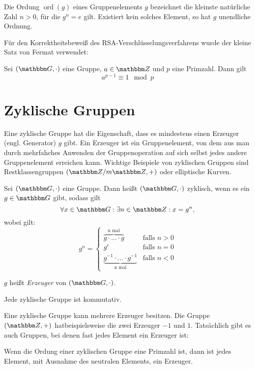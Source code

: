 \begin{definition}
  Die Ordung $\operatorname{ord}(g) $ eines Gruppenelements $g$
  bezeichnet die kleinste 
  natürliche Zahl $n>0$, für die $g^n = e$ gilt. Existiert kein solches
  Element, so hat $g$ unendliche Ordnung.
 \end{definition}

Für den Korrektheitsbeweiß des RSA-Verschlüsselungsverfahrens wurde der
kleine Satz von Fermat verwendet: 
 \begin{theorem}
   Sei $(\G, \cdot)$ eine Gruppe, $a \in \Z{}$ und $p$ eine
   Primzahl. Dann gilt
   \[a^{p-1} \equiv 1 \mod p\]
 \end{theorem}
\section{Zyklische Gruppen}
Eine zyklische Gruppe hat die Eigenschaft, dass es mindestens einen
Erzeuger (engl. Generator) $g$
gibt. Ein Erzeuger ist ein Gruppenelement, von dem aus man durch
mehrfahches Anwenden der Gruppenoperation auf sich selbst
jedes andere Gruppenelement erreichen kann. Wichtige Beispiele von
zyklischen Gruppen sind Restklassengruppen $(\Z{}/m\Z{}, +)$ oder
elliptische Kurven.

\begin{definition}
  Sei $(\G, \cdot)$ eine Gruppe. Dann heißt $(\G, \cdot)$ zyklisch, wenn
  es ein $g \in \G$ gibt, sodass gilt
  \[
    \forall x \in \G: \exists n \in \Z{}: x=g^n,
  \]
  wobei gilt:
\[
 g^n = 
  \begin{cases} 
   \overbrace{g \cdot \dotsc \cdot g}^{\text{n mal}} & \text{falls } n > 0 \\
   g^e       & \text{falls } n = 0 \\
   \underbrace{g^{-1} \cdot \dotsc \cdot g^{-1}}_{\text{n mal}} &
   \text{falls }n < 0
  \end{cases}
\]

$g$ heißt \textit{Erzeuger} von $(\G, \cdot)$. 
\end{definition}

\begin{theorem}
Jede zyklische Gruppe ist kommutativ.  
\end{theorem}

Eine zyklische Gruppe kann mehrere Erzeuger besitzen. Die Gruppe $(\Z{},
+)$ hatbeispielsweise die zwei Erzeuger $-1$ und $1$. Tatsächlich gibt es auch
Gruppen, bei denen fast jedes Element ein Erzeuger ist: 
\begin{theorem} 
Wenn die Ordung einer zyklischen Gruppe eine Primzahl ist, dann ist
jedes Element, mit Ausnahme des neutralen Elements, ein Erzeuger. 
\end{theorem}

